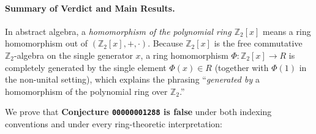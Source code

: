 \documentclass[11pt,a4paper]{article}
\theoremstyle{definition}
\newcommand{\Z}{\mathbb{Z}}
\begin{document}
\paragraph{Summary of Verdict and Main Results.}
In abstract algebra, a \emph{homomorphism of the polynomial ring $\Z_2[x]$} means a ring
homomorphism out of $(\Z_2[x],+,\cdot)$. Because $\Z_2[x]$ is the free commutative
$\Z_2$-algebra on the single generator $x$, a ring homomorphism $\Phi : \Z_2[x] \to R$
is completely generated by the single element $\Phi(x) \in R$ (together with $\Phi(1)$ in
the non-unital setting), which explains the phrasing ``\emph{generated by} a homomorphism
of the polynomial ring over $\Z_2$.''

We prove that \textbf{Conjecture \texttt{00000001288} is false} under both indexing
conventions and under every ring-theoretic interpretation:
\end{document}
